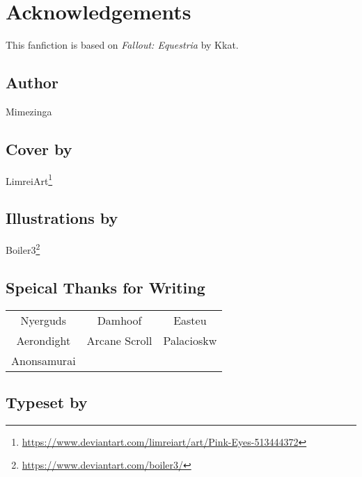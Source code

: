 \chapter{Acknowledgements}

\begin{center}
    This fanfiction is based on \emph{Fallout: Equestria} by Kkat.    
\end{center}

\section*{Author}

\begin{center}
    Mimezinga
\end{center}

\section*{Cover by}

\begin{center}
    LimreiArt\footnote{\url{https://www.deviantart.com/limreiart/art/Pink-Eyes-513444372}}
\end{center}

\section*{Illustrations by}

\begin{center}
    Boiler3\footnote{\url{https://www.deviantart.com/boiler3/}}
\end{center}

\section*{Speical Thanks for Writing}

\begin{table}[H]
    \centering
    \begin{tabular}{ccc}
        Nyerguds & Damhoof & Easteu \\
        Aerondight & Arcane Scroll & Palacioskw \\
        Anonsamurai & & \\
    \end{tabular}
\end{table}

\section*{Typeset by}

